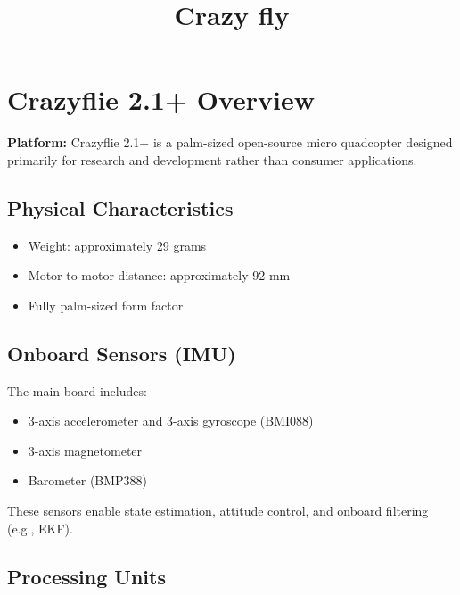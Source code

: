 \documentclass[a4paper]{article}
\title{Crazy fly}
\date{}
\begin{document}
    \maketitle
    
    
    \section{Crazyflie 2.1+ Overview}
        
        \textbf{Platform:} Crazyflie 2.1+ is a palm-sized open-source micro quadcopter designed primarily for research and development rather than consumer applications.
        
        \subsection{Physical Characteristics}
            
            \begin{itemize}
                \item Weight: approximately 29 grams
                \item Motor-to-motor distance: approximately 92 mm
                \item Fully palm-sized form factor
            \end{itemize}
        
        \subsection{Onboard Sensors (IMU)}
            
            The main board includes:
            
            \begin{itemize}
                \item 3-axis accelerometer and 3-axis gyroscope (BMI088)
                \item 3-axis magnetometer
                \item Barometer (BMP388)
            \end{itemize}
            
            These sensors enable state estimation, attitude control, and onboard filtering (e.g., EKF).
        
        \subsection{Processing Units}
            
\end{document}
